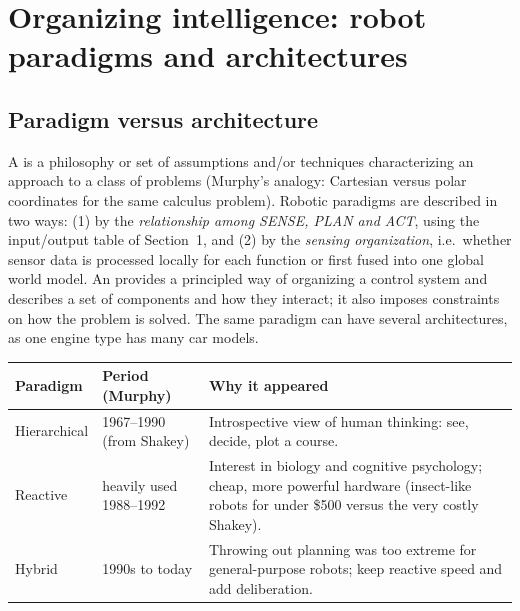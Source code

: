 \section{Organizing intelligence: robot paradigms and architectures}
\subsection{Paradigm versus architecture}
A  is a philosophy or set of assumptions and/or techniques characterizing an approach to a class of problems (Murphy's analogy: Cartesian versus polar coordinates for the same calculus problem). Robotic paradigms are described in two ways: (1) by the \emph{relationship among SENSE, PLAN and ACT}, using the input/output table of Section~1, and (2) by the \emph{sensing organization}, i.e.\ whether sensor data is processed locally for each function or first fused into one global world model. An  provides a principled way of organizing a control system and describes a set of components and how they interact; it also imposes constraints on how the problem is solved. The same paradigm can have several architectures, as one engine type has many car models.

\par\smallskip\begin{tabularx}{\linewidth}{@{}L{30mm}L{30mm}Y@{}}
\toprule
Paradigm & Period (Murphy) & Why it appeared \\
\midrule
Hierarchical & 1967--1990 (from Shakey) & Introspective view of human thinking: see, decide, plot a course. \\
Reactive & heavily used 1988--1992 & Interest in biology and cognitive psychology; cheap, more powerful hardware (insect-like robots for under \$500 versus the very costly Shakey). \\
Hybrid & 1990s to today & Throwing out planning was too extreme for general-purpose robots; keep reactive speed and add deliberation. \\
\bottomrule
\end{tabularx}\par\smallskip

